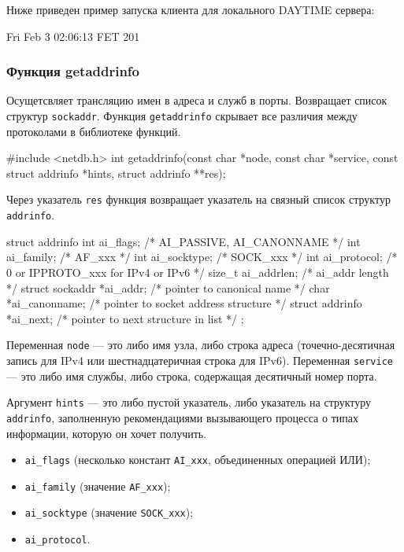 Ниже приведен пример запуска клиента для локального DAYTIME сервера:
\begin{plainlst}{}{}
Fri Feb  3 02:06:13 FET 201
\end{plainlst}

\subsubsection{Функция getaddrinfo}
Осущетсвляет трансляцию имен в адреса и служб в порты. Возвращает список структур \lstinline{sockaddr}. Функция \lstinline{getaddrinfo} скрывает все различия между протоколами в библиотеке функций.

\begin{clst}{}{}
#include <netdb.h>
int getaddrinfo(const char *node, const char *service,
                const struct addrinfo *hints,
                struct addrinfo **res);
\end{clst}

Через указатель \lstinline{res} функция возвращает указатель на связный список структур \lstinline{addrinfo}.
\begin{clst}{}{}
struct addrinfo {
    int              ai_flags;      /* AI_PASSIVE, AI_CANONNAME */
    int              ai_family;     /* AF_xxx */
    int              ai_socktype;   /* SOCK_xxx */
    int              ai_protocol;   /* 0 or IPPROTO_xxx for IPv4 or IPv6 */
    size_t           ai_addrlen;    /* ai_addr length */
    struct sockaddr *ai_addr;       /* pointer to canonical name */
    char            *ai_canonname;  /* pointer to socket address structure */
    struct addrinfo *ai_next;       /* pointer to next structure in list */
};
\end{clst}

Переменная \lstinline{node} --- это либо имя узла, либо строка адреса (точечно-десятичная запись для IPv4 или шестнадцатеричная строка для IPv6). Переменная \lstinline{service} --- это либо имя службы, либо строка, содержащая десятичный номер порта.

Аргумент \lstinline{hints} --- это либо пустой указатель, либо указатель на структуру \lstinline{addrinfo}, заполненную рекомендациями вызывающего процесса о типах информации, которую он хочет получить.
\begin{itemize}
  \item \lstinline{ai_flags} (несколько констант \lstinline{AI_xxx}, объединенных операцией ИЛИ);
  \item \lstinline{ai_family} (значение \lstinline{AF_xxx});
  \item \lstinline{ai_socktype} (значение \lstinline{SOCK_xxx});
  \item \lstinline{ai_protocol}.
\end{itemize}


